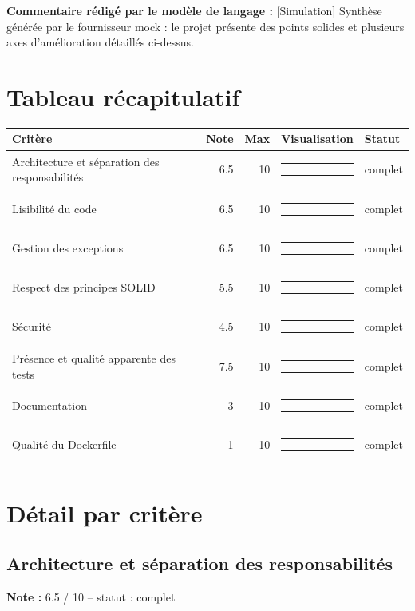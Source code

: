 \documentclass[11pt,a4paper]{article}
\begin{document}
\noindent\textbf{Commentaire rédigé par le modèle de langage :} {[}Simulation{]} Synthèse générée par le fournisseur mock : le projet présente des points solides et plusieurs axes d'amélioration détaillés ci-dessus.

\section{Tableau récapitulatif}
\begin{longtable}{@{}p{5.2cm}rrlp{2.2cm}@{}}
\toprule
\textbf{Critère} & \textbf{Note} & \textbf{Max} & \textbf{Visualisation} & \textbf{Statut} \\
\midrule
\endhead
Architecture et séparation des responsabilités & 6.5 & 10 & \textcolor{scoremid}{\rule{1.95cm}{7pt}}\textcolor{black!12}{\rule{1.05cm}{7pt}} & complet \\
Lisibilité du code & 6.5 & 10 & \textcolor{scoremid}{\rule{1.95cm}{7pt}}\textcolor{black!12}{\rule{1.05cm}{7pt}} & complet \\
Gestion des exceptions & 6.5 & 10 & \textcolor{scoremid}{\rule{1.95cm}{7pt}}\textcolor{black!12}{\rule{1.05cm}{7pt}} & complet \\
Respect des principes SOLID & 5.5 & 10 & \textcolor{scoremid}{\rule{1.65cm}{7pt}}\textcolor{black!12}{\rule{1.35cm}{7pt}} & complet \\
Sécurité & 4.5 & 10 & \textcolor{scorelow}{\rule{1.35cm}{7pt}}\textcolor{black!12}{\rule{1.65cm}{7pt}} & complet \\
Présence et qualité apparente des tests & 7.5 & 10 & \textcolor{scoregood}{\rule{2.25cm}{7pt}}\textcolor{black!12}{\rule{0.75cm}{7pt}} & complet \\
Documentation & 3 & 10 & \textcolor{scorelow}{\rule{0.90cm}{7pt}}\textcolor{black!12}{\rule{2.10cm}{7pt}} & complet \\
Qualité du Dockerfile & 1 & 10 & \textcolor{scorelow}{\rule{0.30cm}{7pt}}\textcolor{black!12}{\rule{2.70cm}{7pt}} & complet \\
\bottomrule
\end{longtable}

\section{Détail par critère}
\subsection{Architecture et séparation des responsabilités}
\noindent\textbf{Note :} 6.5 /\allowbreak{} 10 -- statut : complet
\end{document}
